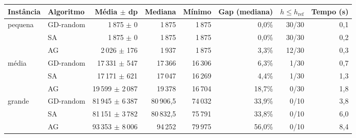 \begin{tabular}{llrrrrrr}
\toprule
Instância & Algoritmo & Média $\pm$ dp & Mediana & Mínimo & Gap (mediana) & $h \le h_{\mathrm{ref}}$ & Tempo (s) \\
\midrule
pequena & GD-random & 1\,875 $\pm$ 0 & 1\,875 & 1\,875 & 0,0\% & 30/30 & 0,1 \\
 & SA & 1\,875 $\pm$ 0 & 1\,875 & 1\,875 & 0,0\% & 30/30 & 0,2 \\
 & AG & 2\,026 $\pm$ 176 & 1\,937 & 1\,875 & 3,3\% & 12/30 & 0,3 \\
\midrule
média & GD-random & 17\,331 $\pm$ 547 & 17\,366 & 16\,306 & 6,3\% & 1/30 & 0,7 \\
 & SA & 17\,171 $\pm$ 621 & 17\,047 & 16\,269 & 4,4\% & 1/30 & 1,3 \\
 & AG & 19\,599 $\pm$ 2\,087 & 19\,378 & 16\,704 & 18,7\% & 0/30 & 1,8 \\
\midrule
grande & GD-random & 81\,945 $\pm$ 6\,387 & 80\,906,5 & 74\,032 & 33,9\% & 0/10 & 3,8 \\
 & SA & 81\,151 $\pm$ 3\,782 & 80\,832,5 & 75\,791 & 33,8\% & 0/10 & 6,0 \\
 & AG & 93\,353 $\pm$ 8\,006 & 94\,252 & 79\,975 & 56,0\% & 0/10 & 8,4 \\
\bottomrule
\end{tabular}
